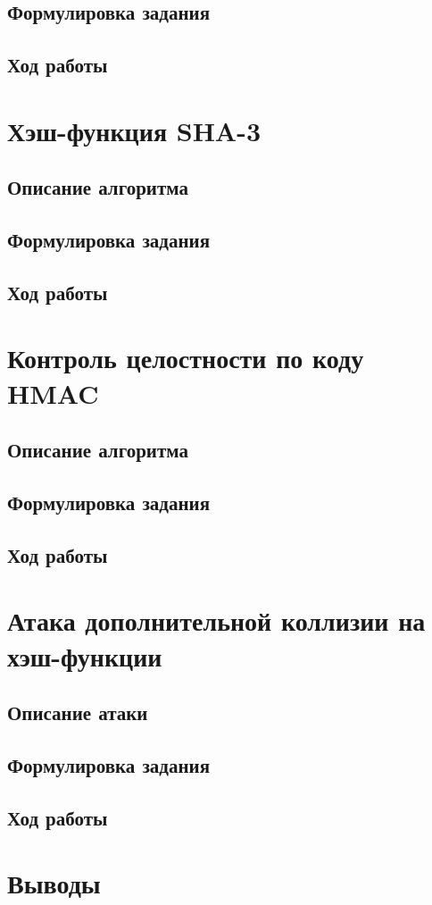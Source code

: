 \documentclass[a4paper, 14pt]{extarticle}
\begin{document}
\subsection{Формулировка задания}
\lipsum[1] %

\subsection{Ход работы}
\lipsum[1] %

\section{Хэш-функция SHA-3}
\subsection{Описание алгоритма}
\lipsum[1] %

\subsection{Формулировка задания}
\lipsum[1] %

\subsection{Ход работы}
\lipsum[1] %

\section{Контроль целостности по коду HMAC}
\subsection{Описание алгоритма}
\lipsum[1] %

\subsection{Формулировка задания}
\lipsum[1] %

\subsection{Ход работы}
\lipsum[1] %

\section{Атака дополнительной коллизии на хэш-функции}
\subsection{Описание атаки}
\lipsum[1] %

\subsection{Формулировка задания}
\lipsum[1] %

\subsection{Ход работы}
\lipsum[1] %

\section*{Выводы}
\lipsum[1] %
\end{document}
